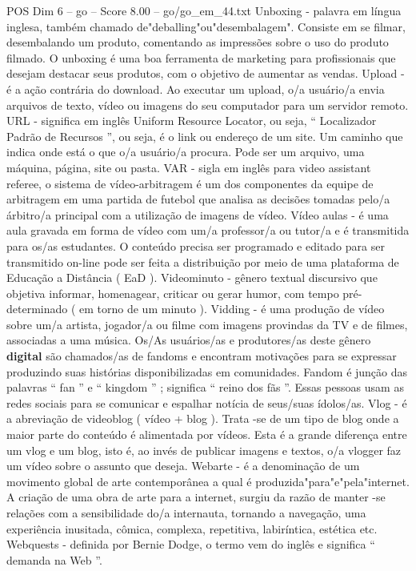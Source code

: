 \begin{textsample}{POS Dim 6 – go – Score 8.00 – go/go\_em\_44.txt}
Unboxing - palavra em língua inglesa, também chamado de"deballing"ou"desembalagem".
Consiste em se filmar, desembalando um produto, comentando as impressões sobre o uso do produto filmado.
O unboxing é uma boa ferramenta de marketing para profissionais que desejam destacar seus produtos, com o objetivo de aumentar as vendas.
Upload - é a ação contrária do download.
Ao executar um upload, o/a usuário/a envia arquivos de texto, vídeo ou imagens do seu computador para um servidor remoto.
URL - significa em inglês Uniform Resource Locator, ou seja, “ Localizador Padrão de Recursos ”, ou seja, é o link ou endereço de um site.
Um caminho que indica onde está o que o/a usuário/a procura.
Pode ser um arquivo, uma máquina, página, site ou pasta.
VAR - sigla em inglês para video assistant referee, o sistema de vídeo-arbitragem é um dos componentes da equipe de arbitragem em uma partida de futebol que analisa as decisões tomadas pelo/a árbitro/a principal com a utilização de imagens de vídeo.
Vídeo aulas - é uma aula gravada em forma de vídeo com um/a professor/a ou tutor/a e é transmitida para os/as estudantes.
O conteúdo precisa ser programado e editado para ser transmitido on-line pode ser feita a distribuição por meio de uma plataforma de Educação a Distância ( EaD ).
Videominuto - gênero textual discursivo que objetiva informar, homenagear, criticar ou gerar humor, com tempo pré-determinado ( em torno de um minuto ).
Vidding - é uma produção de vídeo sobre um/a artista, jogador/a ou filme com imagens provindas da TV e de filmes, associadas a uma música.
Os/As usuários/as e produtores/as deste gênero \textbf{digital} são chamados/as de fandoms e encontram motivações para se expressar produzindo suas histórias disponibilizadas em comunidades.
Fandom é junção das palavras “ fan ” e “ kingdom ” ; significa “ reino dos fãs ”.
Essas pessoas usam as redes sociais para se comunicar e espalhar notícia de seus/suas ídolos/as.
Vlog - é a abreviação de videoblog ( vídeo + blog ).
Trata -se de um tipo de blog onde a maior parte do conteúdo é alimentada por vídeos.
Esta é a grande diferença entre um vlog e um blog, isto é, ao invés de publicar imagens e textos, o/a vlogger faz um vídeo sobre o assunto que deseja.
Webarte - é a denominação de um movimento global de arte contemporânea a qual é produzida"para"e"pela"internet.
A criação de uma obra de arte para a internet, surgiu da razão de manter -se relações com a sensibilidade do/a internauta, tornando a navegação, uma experiência inusitada, cômica, complexa, repetitiva, labiríntica, estética etc.
Webquests - definida por Bernie Dodge, o termo vem do inglês e significa “ demanda na Web ”.

\end{textsample}
